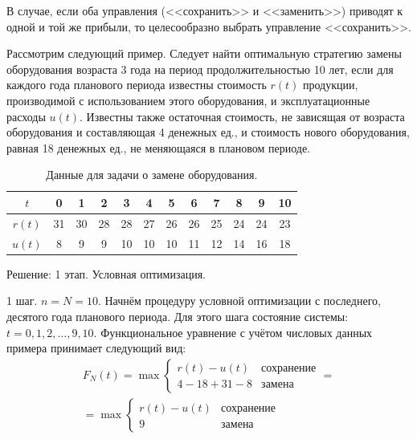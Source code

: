 В случае, если оба управления (<<сохранить>> и <<заменить>>) приводят к одной и той же прибыли, то целесообразно выбрать управление <<сохранить>>.

Рассмотрим следующий пример. Следует найти оптимальную стратегию замены оборудования возраста 3 года на период продолжительностью 10 лет, если для каждого года планового периода известны стоимость $r(t)$ продукции, производимой с использованием этого оборудования, и эксплуатационные расходы $u(t)$. Известны также остаточная стоимость, не зависящая от возраста оборудования и составляющая 4 денежных ед., и стоимость нового оборудования, равная 18 денежных ед., не меняющаяся в плановом периоде.

\begin{table}[h]
    \centering
    \begin{tabular}{|c|c|c|c|c|c|c|c|c|c|c|c|}
            \hline
            $t$ & 0 & 1 & 2 & 3 & 4 & 5 & 6 & 7 & 8 & 9 & 10\\
            \hline
            $r(t)$ & 31 & 30 & 28 & 28 & 27 & 26 & 26 & 25 & 24 & 24 & 23\\
            \hline
            $u(t)$ & 8 & 9 & 9 & 10 & 10 & 10 & 11 & 12 & 14 & 16 & 18\\
            \hline
    \end{tabular}
    \caption{Данные для задачи о замене оборудования.}
\end{table}

Решение:
1 этап. Условная оптимизация. 

1 шаг. $n=N=10$. Начнём процедуру условной оптимизации с последнего, десятого года планового периода. Для этого шага состояние системы: $t=0,1,2, \hdots, 9,10$. Функциональное уравнение с учётом числовых данных примера принимает следующий вид: 
\begin{equation}
\begin{multlined}
    F_N(t) = \max\begin{cases}
                    r(t)-u(t) & \textit{сохранение}\\
                    4-18+31-8 & \textit{замена}
                \end{cases} =\\
            = \max\begin{cases}
                    r(t)-u(t) & \textit{сохранение}\\
                    9 & \textit{замена}
                \end{cases}
\end{multlined}
\end{equation}
 
